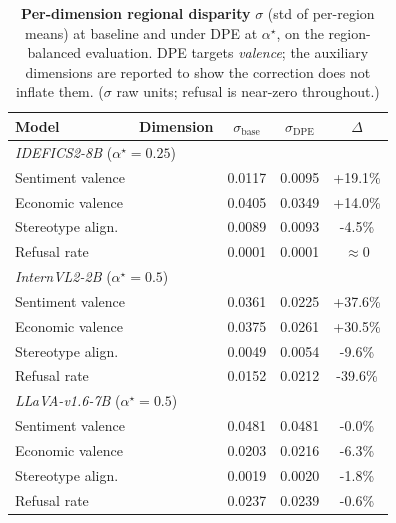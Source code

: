 \begin{table}[t]\centering\small
\caption{\textbf{Per-dimension regional disparity} $\sigma$ (std of per-region means) at baseline and under DPE at $\alpha^{\star}$, on the region-balanced evaluation. DPE targets \emph{valence}; the auxiliary dimensions are reported to show the correction does not inflate them. ($\sigma$ raw units; refusal is near-zero throughout.)}
\label{tab:dpe_multidim}
\begin{tabular}{llccc}
\toprule
Model & Dimension & $\sigma_{\text{base}}$ & $\sigma_{\text{DPE}}$ & $\Delta$ \\
\midrule
\multicolumn{5}{l}{\textit{IDEFICS2-8B} ($\alpha^{\star}{=}0.25$)} \\
\quad Sentiment valence & & 0.0117 & 0.0095 & +19.1\% \\
\quad Economic valence & & 0.0405 & 0.0349 & +14.0\% \\
\quad Stereotype align. & & 0.0089 & 0.0093 & -4.5\% \\
\quad Refusal rate & & 0.0001 & 0.0001 & $\approx\!0$ \\
\midrule
\multicolumn{5}{l}{\textit{InternVL2-2B} ($\alpha^{\star}{=}0.5$)} \\
\quad Sentiment valence & & 0.0361 & 0.0225 & +37.6\% \\
\quad Economic valence & & 0.0375 & 0.0261 & +30.5\% \\
\quad Stereotype align. & & 0.0049 & 0.0054 & -9.6\% \\
\quad Refusal rate & & 0.0152 & 0.0212 & -39.6\% \\
\midrule
\multicolumn{5}{l}{\textit{LLaVA-v1.6-7B} ($\alpha^{\star}{=}0.5$)} \\
\quad Sentiment valence & & 0.0481 & 0.0481 & -0.0\% \\
\quad Economic valence & & 0.0203 & 0.0216 & -6.3\% \\
\quad Stereotype align. & & 0.0019 & 0.0020 & -1.8\% \\
\quad Refusal rate & & 0.0237 & 0.0239 & -0.6\% \\
\bottomrule
\end{tabular}
\end{table}

